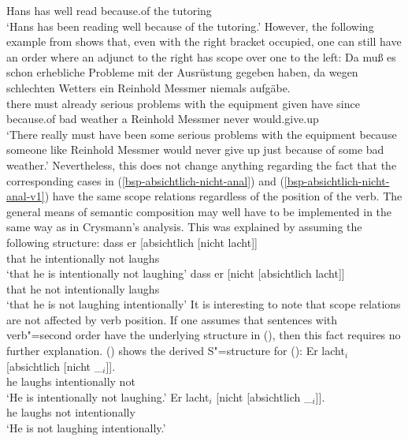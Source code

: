 \begin{enumerate}
{{	 Hans has well read because.of the tutoring\\
\glt `Hans has been reading well because of the tutoring.'
}
\zl
However, the following example from \citet[]{Crysmann2004a} shows that, even with the right bracket occupied, one can still have an
order where an adjunct to the right has scope over one to the left:
\ea
\gll Da muß es schon erhebliche Probleme mit der Ausrüstung gegeben haben, da wegen schlechten
  Wetters ein Reinhold Messmer niemals aufgäbe.\\
  there must \expl{} already serious problems with the equipment given have since because.of bad weather a Reinhold Messmer never
  would.give.up\\
 \glt `There really must have been some serious problems with the equipment because someone like Reinhold Messmer would never give
  up just because of some bad weather.'
\z
Nevertheless, this does not change anything regarding the fact that the corresponding cases in (\ref{bsp-absichtlich-nicht-anal}) 
and (\ref{bsp-absichtlich-nicht-anal-v1}) have the same scope relations regardless of the position of the verb. The general means of semantic
composition may well have to be implemented in the same way as in Crysmann's analysis.%
}
This was explained by assuming the following structure:
\eal
\label{bsp-absichtlich-nicht-anal}
\ex 
\gll dass er [absichtlich [nicht lacht]]\\
     that he \spacebr{}intentionally \spacebr{}not laughs\\
\glt `that he is intentionally not laughing'
\ex 
\gll dass er [nicht [absichtlich lacht]]\\
     that he \spacebr{}not \spacebr{}intentionally laughs\\
\glt `that he is not laughing intentionally'
\zl
It is interesting to note that scope relations are not affected by verb position. If one assumes that sentences with verb"=second
order have the underlying structure in (), then this fact requires no further explanation. () shows
the derived S"=structure for ():
\eal
\label{bsp-absichtlich-nicht-anal-v1}
\ex 
\gll Er lacht$_i$ [absichtlich [nicht \_$_i$]].\\
     he laughs \spacebr{}intentionally \spacebr{}not\\
\glt `He is intentionally not laughing.'
\ex 
\gll Er lacht$_i$  [nicht [absichtlich \_$_i$]].\\
     he laughs \spacebr{}not \spacebr{}intentionally\\
\glt `He is not laughing intentionally.'
\zl{}
\nocite{Hoehle88a,Hoehle97a}
\end{enumerate}

